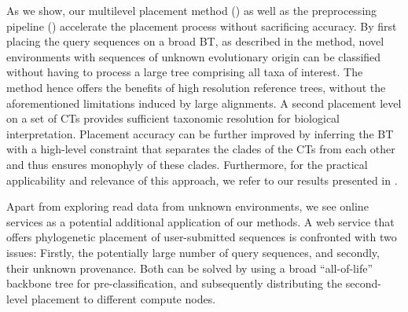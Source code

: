 As we show, our multilevel placement method ()
as well as the preprocessing pipeline ()
accelerate the placement process without sacrificing accuracy.
By first placing the query sequences on a broad \acf{BT}, as described in the method,
novel environments with sequences of unknown evolutionary origin can be classified
without having to process a large tree comprising all taxa of interest.
The method hence offers the benefits of high resolution reference trees,
without the aforementioned limitations induced by large alignments.
A second placement level on a set of \acfp{CT} provides sufficient taxonomic resolution for biological interpretation.
Placement accuracy can be further improved by inferring the \ac{BT}
with a high-level constraint that separates the clades of the \acp{CT} from each other
and thus ensures monophyly of these clades.
Furthermore, for the practical applicability and relevance of this approach, 
we refer to our results presented in .

Apart from exploring read data from unknown environments,
we see online services as a potential additional application of our methods.
A web service that offers phylogenetic placement of user-submitted sequences is confronted with two issues:
Firstly, the potentially large number of query sequences, and secondly, their unknown provenance.
Both can be solved by using a broad ``all-of-life'' backbone tree for pre-classification,
and subsequently distributing the second-level placement to different compute nodes.



